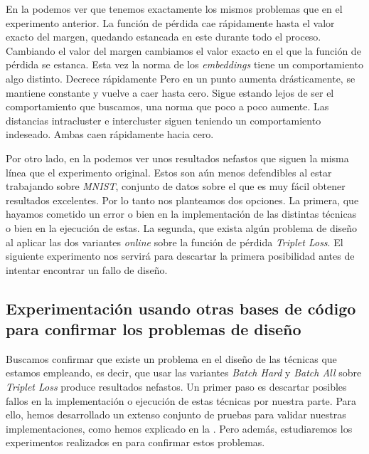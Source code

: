 En la  podemos ver que tenemos exactamente los mismos problemas que en el experimento anterior. La función de pérdida cae rápidamente hasta el valor exacto del margen, quedando estancada en este durante todo el proceso. Cambiando el valor del margen cambiamos el valor exacto en el que la función de pérdida se estanca. Esta vez la norma de los \textit{embeddings} tiene un comportamiento algo distinto. Decrece rápidamente Pero en un punto aumenta drásticamente, se mantiene constante y vuelve a caer hasta cero. Sigue estando lejos de ser el comportamiento que buscamos, una norma que poco a poco aumente. Las distancias intracluster e intercluster siguen teniendo un comportamiento indeseado. Ambas caen rápidamente hacia cero.

Por otro lado, en la  podemos ver unos resultados nefastos que siguen la misma línea que el experimento original. Estos son aún menos defendibles al estar trabajando sobre \textit{MNIST}, conjunto de datos sobre el que es muy fácil obtener resultados excelentes. Por lo tanto nos planteamos dos opciones. La primera, que hayamos cometido un error o bien en la implementación de las distintas técnicas o bien en la ejecución de estas. La segunda, que exista algún problema de diseño al aplicar las dos variantes \textit{online} sobre la función de pérdida \textit{Triplet Loss}. El siguiente experimento nos servirá para descartar la primera posibilidad antes de intentar encontrar un fallo de diseño.

\subsection{Experimentación usando otras bases de código para confirmar los problemas de diseño} \label{isubsec:experiemntacion_base_codigo_externa}

Buscamos confirmar que existe un problema en el diseño de las técnicas que estamos empleando, es decir, que usar las variantes \textit{Batch Hard} y \textit{Batch All} sobre \textit{Triplet Loss} produce resultados nefastos. Un primer paso es descartar posibles fallos en la implementación o ejecución de estas técnicas por nuestra parte. Para ello, hemos desarrollado un extenso conjunto de pruebas para validar nuestras implementaciones, como hemos explicado en la . Pero además, estudiaremos los experimentos realizados en \cite{informatica:adambielski_github} para confirmar estos problemas.

